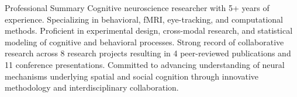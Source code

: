 \documentclass{resume} %
\begin{document}
    
    \fancyhead[RO,LE]{\today}
    
    
    \begin{rSection}{Professional Summary}
        {Cognitive neuroscience researcher with 5+ years of experience. 
            Specializing in behavioral, fMRI, 
            eye-tracking, and computational methods. Proficient in experimental 
            design, cross-modal research, and statistical 
            modeling of cognitive and behavioral processes. Strong record of 
            collaborative 
            research across 8 research projects resulting in 4 peer-reviewed 
            publications and 11 conference presentations. Committed to 
            advancing 
            understanding of neural mechanisms underlying spatial and social 
            cognition through innovative methodology and interdisciplinary 
            collaboration.}
    \end{rSection}
    
    
\end{document}
